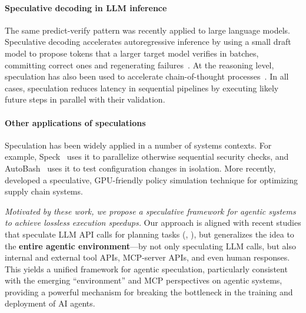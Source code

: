 \documentclass{article} %
\theoremstyle{plain} %
\theoremstyle{definition} %
\theoremstyle{remark} %
\begin{document}
\paragraph{Speculative decoding in LLM inference}
The same predict-verify pattern was recently applied to large language models. 
Speculative decoding accelerates autoregressive inference 
by using a small draft model to propose tokens that a larger target model verifies in batches, 
committing correct ones and regenerating failures~\citep{leviathan2023fast,zhang2024beyond,chen2023acceleratinglargelanguagemodel}. 
At the reasoning level, speculation has also been used to accelerate chain-of-thought processes~\citep{wang2025acceleratinglargelanguagemodel,wang2025efficientreasoningllmsspeculative,fu2025scaling}.
In all cases, speculation reduces latency in sequential pipelines by executing likely future steps in parallel with their validation.

\paragraph{Other applications of speculations} Speculation has been widely applied in a number of systems contexts. For example, Speck~\citep{nightingale2008parallelizing} uses it to parallelize otherwise sequential security checks, and AutoBash~\citep{su2007autobash} uses it to test configuration changes in isolation. More recently, \cite{farias2024speeding} developed a speculative, GPU-friendly policy simulation technique for optimizing supply chain systems. 

\textit{Motivated by these work, we propose a speculative framework for agentic systems to achieve lossless execution speedups.} Our approach is aligned with recent studies that speculate LLM API calls for planning tasks (\cite{hua2024interactivespeculativeplanningenhance}, \cite{guan2025dynamicspeculativeagentplanning}), but generalizes the idea to the \textbf{entire agentic environment}—by not only speculating LLM calls, but also internal and external tool APIs, MCP-server APIs, and even human responses. This yields a unified framework for agentic speculation, particularly consistent with the emerging “environment” and MCP perspectives on agentic systems, providing a powerful mechanism for breaking the bottleneck in the training and deployment of AI agents.
\end{document}
